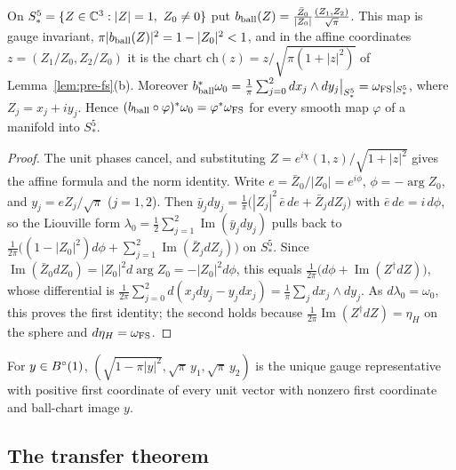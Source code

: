 \begin{lemma}\label{lem:rtc-ball-chart}
On $S^5_*=\{Z\in\mathbb{C}^3:|Z|=1,\ Z_0\ne0\}$ put $b_{\rm ball}(Z)=\frac{\bar Z_0}{|Z_0|}\frac{(Z_1,Z_2)}{\sqrt\pi}$. This map is gauge
invariant, $\pi|b_{\rm ball}(Z)|^2=1-|Z_0|^2<1$, and in the affine coordinates $z=(Z_1/Z_0,Z_2/Z_0)$ it is the chart
$\mathrm{ch}(z)=z/\sqrt{\pi(1+|z|^2)}$ of Lemma~\ref{lem:pre-fs}(b). Moreover
$b_{\rm ball}^*\omega_0=\frac1\pi\sum_{j=0}^2dx_j\wedge dy_j\big|_{S^5_*}=\omega_{\rm FS}|_{S^5_*}$, where $Z_j=x_j+iy_j$. Hence
$(b_{\rm ball}\circ\varphi)^*\omega_0=\varphi^*\omega_{\rm FS}$ for every smooth map $\varphi$ of a manifold into $S^5_*$.
\end{lemma}

\begin{proof}
The unit phases cancel, and substituting $Z=e^{i\chi}(1,z)/\sqrt{1+|z|^2}$ gives the affine formula and the norm identity.
Write $e=\bar Z_0/|Z_0|=e^{i\phi}$, $\phi=-\arg Z_0$, and $y_j=eZ_j/\sqrt\pi$ ($j=1,2$). Then
$\bar y_jdy_j=\frac1\pi\big(|Z_j|^2\,\bar e\,de+\bar Z_jdZ_j\big)$ with $\bar e\,de=i\,d\phi$, so the Liouville form
$\lambda_0=\frac12\sum_{j=1}^2\operatorname{Im}(\bar y_jdy_j)$ pulls back to
$\frac1{2\pi}\big((1-|Z_0|^2)d\phi+\sum_{j=1}^2\operatorname{Im}(\bar Z_jdZ_j)\big)$ on $S^5_*$. Since
$\operatorname{Im}(\bar Z_0dZ_0)=|Z_0|^2d\arg Z_0=-|Z_0|^2d\phi$, this equals $\frac1{2\pi}\big(d\phi+\operatorname{Im}(Z^\dagger dZ)\big)$, whose
differential is $\frac1{2\pi}\sum_{j=0}^2d(x_jdy_j-y_jdx_j)=\frac1\pi\sum_jdx_j\wedge dy_j$. As $d\lambda_0=\omega_0$, this proves the first
identity; the second holds because $\frac1{2\pi}\operatorname{Im}(Z^\dagger dZ)=\eta_H$ on the sphere and $d\eta_H=\omega_{\rm FS}$.
\end{proof}

For $y\in B^{\circ}(1)$, $(\sqrt{1-\pi|y|^2},\sqrt\pi\,y_1,\sqrt\pi\,y_2)$ is the unique gauge representative with positive first coordinate of every unit vector with nonzero first coordinate and ball-chart image $y$.

\subsection{The transfer theorem}\label{sec:rtc-transfer}

